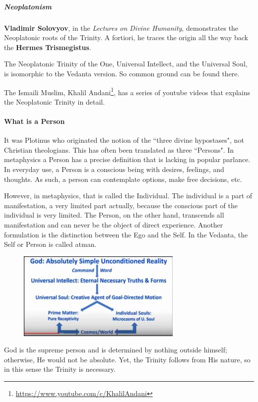 \subparagraph{Neoplatonism}

\textbf{Vladimir Solovyov}, in the \emph{Lectures on Divine Humanity}, demonstrates the Neoplatonic roots of the Trinity. A fortiori, he traces the origin all the way back the \textbf{Hermes Trismegistus}.

The Neoplatonic Trinity of the One, Universal Intellect, and the Universal Soul, is isomorphic to the Vedanta version. So common ground can be found there.

The Ismaili Muslim, Khalil Andani\footnote{\url{https://www.youtube.com/c/KhalilAndani}}, has a series of youtube videos that explains the Neoplatonic Trinity in detail.

\paragraph{What is a Person}
It was Plotinus who originated the notion of the ``three divine hypostases", not Christian theologians. This has often been translated as three ``Persons". In metaphysics a Person has a precise definition that is lacking in popular parlance. In everyday use, a Person is a conscious being with desires, feelings, and thoughts. As such, a person can contemplate options, make free decisions, etc.

However, in metaphysics, that is called the Individual. The individual is a part of manifestation, a very limited part actually, because the conscious part of the individual is very limited. The Person, on the other hand, transcends all manifestation and can never be the object of direct experience. Another formulation is the distinction between the Ego and the Self. In the Vedanta, the Self or Person is called atman.

\begin{figure}
 \includegraphics[scale=.6]{a20220824MeditationontheTrinity-img001.jpg}
 \end{figure}

God is the supreme person and is determined by nothing outside himself; otherwise, He would not be absolute. Yet, the Trinity follows from His nature, so in this sense the Trinity is necessary.

